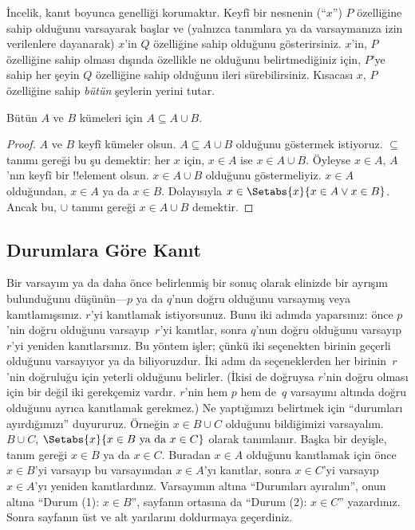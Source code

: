 İncelik, kanıt boyunca genelliği korumaktır. Keyfî bir nesnenin
(``$x$'') $P$ özelliğine sahip olduğunu varsayarak başlar ve (yalnızca
tanımlara ya da varsaymanıza izin verilenlere dayanarak) $x$'in $Q$
özelliğine sahip olduğunu gösterirsiniz. $x$'in, $P$ özelliğine sahip
olması dışında özellikle ne olduğunu belirtmediğiniz için, $P$'ye
sahip her şeyin $Q$ özelliğine sahip olduğunu ileri sürebilirsiniz.
Kısacası $x$, $P$ özelliğine sahip \emph{bütün} şeylerin yerini tutar.

\begin{prop}
  Bütün $A$ ve $B$ kümeleri için $A \subseteq A \cup B$.
\end{prop}

\begin{proof}
  $A$ ve $B$ keyfî kümeler olsun. $A \subseteq A \cup B$ olduğunu
  göstermek istiyoruz. $\subseteq$ tanımı gereği bu şu demektir: her
  $x$ için, $x \in A$ ise $x \in A \cup B$. Öyleyse $x \in A$, $A$'nın
  keyfî bir !!{element} olsun. $x \in A \cup B$
  olduğunu göstermeliyiz.
  $x \in A$ olduğundan, $x \in A$ ya da $x \in B$. Dolayısıyla $x \in
  \Setabs{x}{x \in A \lor x \in B}$. Ancak bu, $\cup$ tanımı gereği
  $x \in A \cup B$ demektir.
\end{proof}


\subsection{Durumlara Göre Kanıt}

Bir varsayım ya da daha önce belirlenmiş bir sonuç olarak elinizde bir
ayrışım bulunduğunu düşünün---$p$ ya da $q$'nun doğru olduğunu varsaymış
veya kanıtlamışsınız. $r$'yi kanıtlamak istiyorsunuz. Bunu iki adımda
yaparsınız: önce $p$'nin doğru olduğunu varsayıp~$r$'yi kanıtlar, sonra
$q$'nun doğru olduğunu varsayıp~$r$'yi yeniden kanıtlarsınız. Bu yöntem
işler; çünkü iki seçenekten birinin geçerli olduğunu varsayıyor ya da
biliyoruzdur. İki adım da seçeneklerden her birinin~$r$'nin doğruluğu
  için yeterli olduğunu belirler. (İkisi de doğruysa $r$'nin doğru olması
  için bir değil iki gerekçemiz vardır. $r$'nin hem $p$ hem de~$q$
  varsayımı altında doğru olduğunu ayrıca kanıtlamak gerekmez.) Ne
yaptığımızı belirtmek için ``durumları ayırdığımızı'' duyururuz.
Örneğin $x \in B \cup C$ olduğunu bildiğimizi varsayalım. $B \cup C$,
$\Setabs{x}{x \in B \text{ ya da } x \in C}$ olarak tanımlanır. Başka
bir deyişle, tanım gereği $x \in B$ ya da $x \in C$. Buradan $x \in A$
olduğunu kanıtlamak için önce $x \in B$'yi varsayıp bu varsayımdan $x
\in A$'yı kanıtlar, sonra $x \in C$'yi varsayıp $x \in A$'yı yeniden
kanıtlardınız. Varsayımın altına ``Durumları ayıralım'', onun altına
``Durum (1): $x \in B$'', sayfanın ortasına da ``Durum (2): $x \in C$''
yazardınız. Sonra sayfanın üst ve alt yarılarını doldurmaya geçerdiniz.

